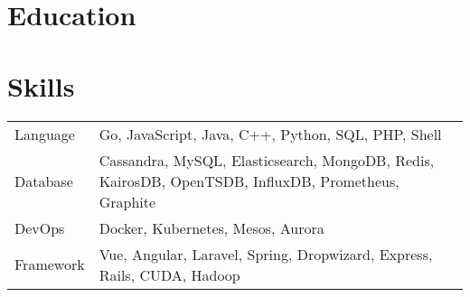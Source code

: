 \documentclass[11pt, letterpaper]{simple-cv}
\begin{document}





\section{Education}
{}

\section{Skills}
\begin{flushleft}
	\begin{tabular}{@{}ll@{}}
		Language  & Go, JavaScript, Java, C++, Python, SQL, PHP, Shell                                                  \\
		Database  & Cassandra, MySQL, Elasticsearch, MongoDB, Redis, KairosDB, OpenTSDB, InfluxDB, Prometheus, Graphite \\
		DevOps    & Docker, Kubernetes, Mesos, Aurora                                                                   \\
		Framework & Vue, Angular, Laravel, Spring, Dropwizard, Express, Rails, CUDA, Hadoop
	\end{tabular}
\end{flushleft}
\end{document}

